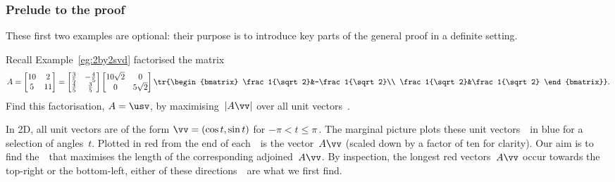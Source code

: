 \subsubsection{Prelude to the proof}

These first two examples are optional: their purpose is to introduce key parts of the general proof in a definite setting.

\begin{example} \label{eg:2by2svdx}
Recall Example~\ref{eg:2by2svd} factorised the matrix
\begin{equation*}
A=\begin{bmatrix} 10&2\\5&11 \end{bmatrix}=
\begin{bmatrix} \frac35&-\frac45\\\frac45&\frac35 \end{bmatrix}
\begin{bmatrix} 10\sqrt2&0\\0&5\sqrt2 \end{bmatrix}
\tr{\begin{bmatrix} \frac1{\sqrt2}&-\frac1{\sqrt2}\\ \frac1{\sqrt2}&\frac1{\sqrt2} \end{bmatrix}}.
\end{equation*}
Find this factorisation, \(A=\usv\), by maximising~\(|A\vv|\) over all unit vectors~\vv.


\begin{solution} 
In 2D, all unit vectors are of the form \(\vv=(\cos t,\sin t)\) for \(-\pi<t\leq\pi\)\,.  
The marginal picture plots these unit vectors~\vv\ in blue for a selection of angles~\(t\).
Plotted in red from the end of each~\vv\ is the vector~\(A\vv\) (scaled down by a factor of ten for clarity).
Our aim is to find the~\vv\ that maximises the length of the corresponding adjoined~\(A\vv\).
By inspection, the longest red vectors~\(A\vv\) occur towards the top-right or the bottom-left, either of these directions~\vv\ are what we first find.


\end{solution}
\end{example}
